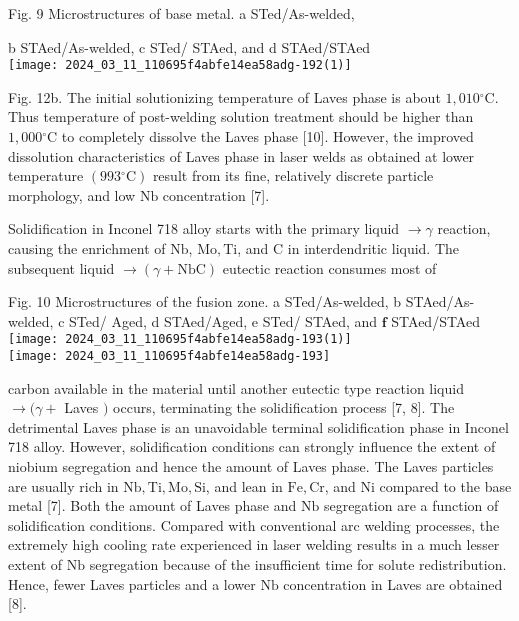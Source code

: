 \documentclass[10pt]{article}
\begin{document}
Fig. 9 Microstructures of base metal. a STed/As-welded,

b STAed/As-welded, c STed/ STAed, and d STAed/STAed\\
\texttt{[image: 2024\_03\_11\_110695f4abfe14ea58adg-192(1)]}

Fig. 12b. The initial solutionizing temperature of Laves phase is about $1,010{ }^{\circ} \mathrm{C}$. Thus temperature of post-welding solution treatment should be higher than $1,000{ }^{\circ} \mathrm{C}$ to completely dissolve the Laves phase [10]. However, the improved dissolution characteristics of Laves phase in laser welds as obtained at lower temperature $\left(993{ }^{\circ} \mathrm{C}\right)$ result from its fine, relatively discrete particle morphology, and low $\mathrm{Nb}$ concentration [7].

Solidification in Inconel 718 alloy starts with the primary liquid $\rightarrow \gamma$ reaction, causing the enrichment of $\mathrm{Nb}$, $\mathrm{Mo}, \mathrm{Ti}$, and $\mathrm{C}$ in interdendritic liquid. The subsequent liquid $\rightarrow(\gamma+\mathrm{NbC})$ eutectic reaction consumes most of

Fig. 10 Microstructures of the fusion zone. a STed/As-welded, b STAed/As-welded, c STed/ Aged, d STAed/Aged, e STed/ STAed, and $\mathbf{f}$ STAed/STAed\\
\texttt{[image: 2024\_03\_11\_110695f4abfe14ea58adg-193(1)]}\\
\texttt{[image: 2024\_03\_11\_110695f4abfe14ea58adg-193]}

carbon available in the material until another eutectic type reaction liquid $\rightarrow(\gamma+$ Laves $)$ occurs, terminating the solidification process [7, 8]. The detrimental Laves phase is an unavoidable terminal solidification phase in Inconel 718 alloy. However, solidification conditions can strongly influence the extent of niobium segregation and hence the amount of Laves phase. The Laves particles are usually rich in $\mathrm{Nb}, \mathrm{Ti}, \mathrm{Mo}, \mathrm{Si}$, and lean in $\mathrm{Fe}, \mathrm{Cr}$, and $\mathrm{Ni}$ compared to the base metal [7]. Both the amount of Laves phase and $\mathrm{Nb}$ segregation are a function of solidification conditions. Compared with conventional arc welding processes, the extremely high cooling rate experienced in laser welding results in a much lesser extent of $\mathrm{Nb}$ segregation because of the insufficient time for solute redistribution. Hence, fewer Laves particles and a lower $\mathrm{Nb}$ concentration in Laves are obtained [8].
\end{document}
